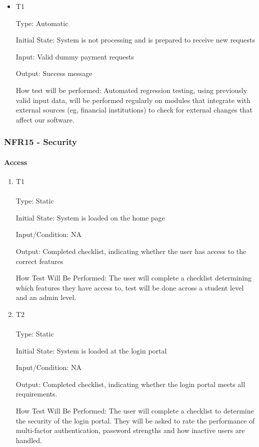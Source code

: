 \documentclass[12pt, titlepage]{article}
\begin{document}
\begin{itemize}

\item{T1\\}

Type: Automatic

Initial State: System is not processing and is prepared to receive new requests

Input: Valid dummy payment requests

Output: Success message

How test will be performed: Automated regression testing, using previously valid input data, will be performed regularly on modules that integrate with external sources (eg, financial institutions) to check for external changes that affect our software.

\end{itemize}

\hypertarget{nfr15}{}
\subsubsection{NFR15 - Security}
\paragraph{Access}
\begin{enumerate}
\item {T1\\}\\
Type: Static

Initial State: System is loaded on the home page

Input/Condition: NA

Output: Completed checklist, indicating whether the user has access to the correct features

How Test Will Be Performed: The user will complete a checklist determining which features they have access to, test will be done across a student level and an admin level.

\item {T2\\}\\
Type: Static

Initial State: System is loaded at the login portal

Input/Condition: NA

Output: Completed checklist, indicating whether the login portal meets all requirements.

How Test Will Be Performed: The user will complete a checklist to determine the security of the login portal. They will be asked to rate the performance of multi-factor authentication, password strengths and how inactive users are handled.
\end{enumerate}
\end{document}
